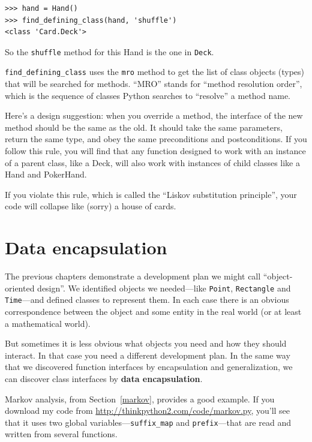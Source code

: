 \documentclass[10pt]{book}
\begin{document}
\begin{verbatim}
>>> hand = Hand()
>>> find_defining_class(hand, 'shuffle')
<class 'Card.Deck'>
\end{verbatim}
%
So the {\tt shuffle} method for this Hand is the one in {\tt Deck}.

\verb"find_defining_class" uses the {\tt mro} method to get the list
of class objects (types) that will be searched for methods.  ``MRO''
stands for ``method resolution order'', which is the sequence of
classes Python searches to ``resolve'' a method name.

Here's a design suggestion: when you override a method,
the interface of the new method should be the same as the old.  It
should take the same parameters, return the same type, and obey the
same preconditions and postconditions.  If you follow this rule, you
will find that any function designed to work with an instance of a
parent class, like a Deck, will also work with instances of child
classes like a Hand and PokerHand.

If you violate this rule, which is called the ``Liskov substitution
principle'', your code will collapse like (sorry) a house of cards.


\section{Data encapsulation}

The previous chapters demonstrate a development plan we might call
``object-oriented design''.  We identified objects we needed---like
{\tt Point}, {\tt Rectangle} and {\tt Time}---and defined classes to
represent them.  In each case there is an obvious correspondence
between the object and some entity in the real world (or at least a
mathematical world).  

But sometimes it is less obvious what objects you need
and how they should interact.  In that case you need a different
development plan.  In the same way that we discovered function
interfaces by encapsulation and generalization, we can discover
class interfaces by {\bf data encapsulation}.

Markov analysis, from Section~\ref{markov}, provides a good example.
If you download my code from \url{http://thinkpython2.com/code/markov.py},
you'll see that it uses two global variables---\verb"suffix_map" and
\verb"prefix"---that are read and written from several functions.
\end{document}
